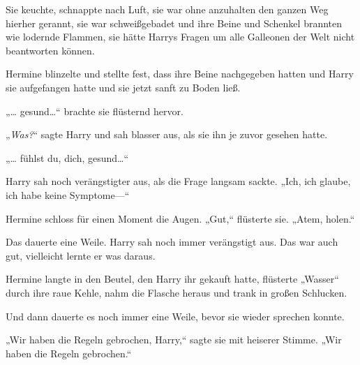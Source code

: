 Sie keuchte, schnappte nach Luft, sie war ohne anzuhalten den ganzen Weg hierher gerannt, sie war schweißgebadet und ihre Beine und Schenkel brannten wie lodernde Flammen, sie hätte Harrys Fragen um alle Galleonen der Welt nicht beantworten können.

Hermine blinzelte und stellte fest, dass ihre Beine nachgegeben hatten und Harry sie aufgefangen hatte und sie jetzt sanft zu Boden ließ.

„… gesund…“ brachte sie flüsternd hervor.

„\emph{Was?}“ sagte Harry und sah blasser aus, als sie ihn je zuvor gesehen hatte.

„… fühlst du, dich, gesund…“

Harry sah noch verängstigter aus, als die Frage langsam sackte. „Ich, ich glaube, ich habe keine Symptome—“

Hermine schloss für einen Moment die Augen. „Gut,“ flüsterte sie. „Atem, holen.“

Das dauerte eine Weile. Harry sah noch immer verängstigt aus. Das war auch gut, vielleicht lernte er was daraus.

Hermine langte in den Beutel, den Harry ihr gekauft hatte, flüsterte „Wasser“ durch ihre raue Kehle, nahm die Flasche heraus und trank in großen Schlucken.

Und dann dauerte es noch immer eine Weile, bevor sie wieder sprechen konnte.

„Wir haben die Regeln gebrochen, Harry,“ sagte sie mit heiserer Stimme. „Wir haben die Regeln gebrochen.“

